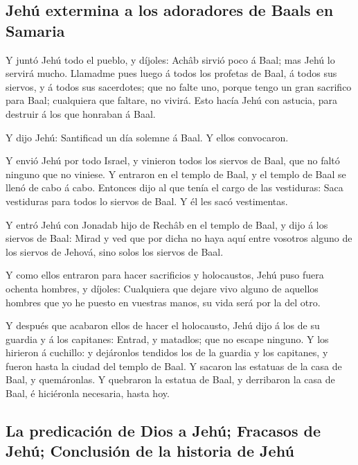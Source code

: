 \hypertarget{jehuxfa-extermina-a-los-adoradores-de-baals-en-samaria}{%
\subsection{Jehú extermina a los adoradores de Baals en
Samaria}\label{jehuxfa-extermina-a-los-adoradores-de-baals-en-samaria}}

 Y juntó Jehú todo el pueblo, y díjoles: Achâb sirvió poco
á Baal; mas Jehú lo servirá mucho.  Llamadme pues luego á
todos los profetas de Baal, á todos sus siervos, y á todos sus
sacerdotes; que no falte uno, porque tengo un gran sacrifico para Baal;
cualquiera que faltare, no vivirá. Esto hacía Jehú con astucia, para
destruir á los que honraban á Baal.

 Y dijo Jehú: Santificad un día solemne á Baal. Y ellos
convocaron.

 Y envió Jehú por todo Israel, y vinieron todos los siervos
de Baal, que no faltó ninguno que no viniese. Y entraron en el templo de
Baal, y el templo de Baal se llenó de cabo á cabo. 
Entonces dijo al que tenía el cargo de las vestiduras: Saca vestiduras
para todos lo siervos de Baal. Y él les sacó vestimentas.

 Y entró Jehú con Jonadab hijo de Rechâb en el templo de
Baal, y dijo á los siervos de Baal: Mirad y ved que por dicha no haya
aquí entre vosotros alguno de los siervos de Jehová, sino solos los
siervos de Baal.

 Y como ellos entraron para hacer sacrificios y
holocaustos, Jehú puso fuera ochenta hombres, y díjoles: Cualquiera que
dejare vivo alguno de aquellos hombres que yo he puesto en vuestras
manos, su vida será por la del otro.

 Y después que acabaron ellos de hacer el holocausto, Jehú
dijo á los de su guardia y á los capitanes: Entrad, y matadlos; que no
escape ninguno. Y los hirieron á cuchillo: y dejáronlos tendidos los de
la guardia y los capitanes, y fueron hasta la ciudad del templo de Baal.
 Y sacaron las estatuas de la casa de Baal, y quemáronlas.
 Y quebraron la estatua de Baal, y derribaron la casa de
Baal, é hiciéronla necesaria, hasta hoy.

\hypertarget{la-predicaciuxf3n-de-dios-a-jehuxfa-fracasos-de-jehuxfa-conclusiuxf3n-de-la-historia-de-jehuxfa}{%
\subsection{La predicación de Dios a Jehú; Fracasos de Jehú; Conclusión
de la historia de
Jehú}\label{la-predicaciuxf3n-de-dios-a-jehuxfa-fracasos-de-jehuxfa-conclusiuxf3n-de-la-historia-de-jehuxfa}}

